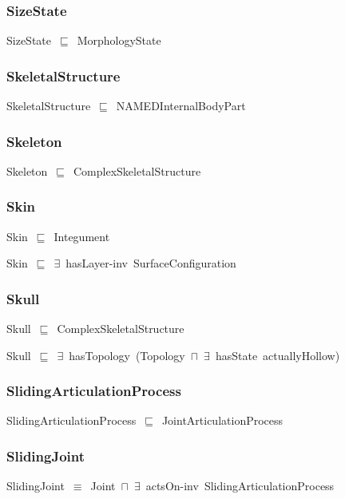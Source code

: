 \documentclass{article}
\begin{document}
\subsubsection*{SizeState}

SizeState~\ensuremath{\sqsubseteq}~MorphologyState~

\subsubsection*{SkeletalStructure}

SkeletalStructure~\ensuremath{\sqsubseteq}~NAMEDInternalBodyPart~

\subsubsection*{Skeleton}

Skeleton~\ensuremath{\sqsubseteq}~ComplexSkeletalStructure~

\subsubsection*{Skin}

Skin~\ensuremath{\sqsubseteq}~Integument~

Skin~\ensuremath{\sqsubseteq}~\ensuremath{\exists}~hasLayer-inv~SurfaceConfiguration~

\subsubsection*{Skull}

Skull~\ensuremath{\sqsubseteq}~ComplexSkeletalStructure~

Skull~\ensuremath{\sqsubseteq}~\ensuremath{\exists}~hasTopology~(Topology~\ensuremath{\sqcap}~\ensuremath{\exists}~hasState~actuallyHollow)~

\subsubsection*{SlidingArticulationProcess}

SlidingArticulationProcess~\ensuremath{\sqsubseteq}~JointArticulationProcess~

\subsubsection*{SlidingJoint}

SlidingJoint~\ensuremath{\equiv}~Joint~\ensuremath{\sqcap}~\ensuremath{\exists}~actsOn-inv~SlidingArticulationProcess
\end{document}
